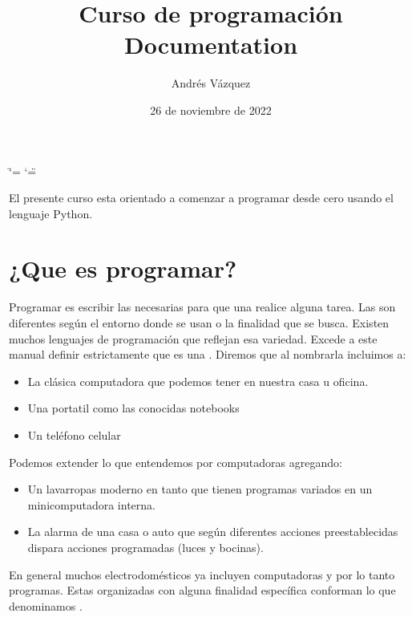 \documentclass[a5paper,9pt,spanish]{sphinxmanual}
\title{Curso de programación Documentation}
\date{26 de noviembre de 2022}
\author{Andrés Vázquez}
\begin{document}
\ifdefined\shorthandoff
  \ifnum\catcode`\=\string=\active\shorthandoff{=}\fi
  \ifnum\catcode`\"=\active{}\fi
\fi

\pagestyle{empty}
\sphinxmaketitle
\pagestyle{plain}
\sphinxtableofcontents
\pagestyle{normal}
\label{\detokenize{index::doc}}


\sphinxAtStartPar
El presente curso esta orientado a comenzar a programar desde cero usando el lenguaje Python.

\sphinxstepscope


\chapter{¿Que es programar?}
\label{\detokenize{que:que-es-programar}}\label{\detokenize{que::doc}}
\sphinxAtStartPar
Programar es escribir las  necesarias para que una  realice alguna tarea.
Las  son diferentes según el entorno donde se usan o la finalidad que se busca.
Existen muchos lenguajes de programación que reflejan esa variedad.
Excede a este manual definir estrictamente que es una . Diremos que al nombrarla incluimos a:
\begin{itemize}
\item {} 
\sphinxAtStartPar
La clásica computadora que podemos tener en nuestra casa u oficina.

\item {} 
\sphinxAtStartPar
Una portatil como las conocidas notebooks

\item {} 
\sphinxAtStartPar
Un teléfono celular

\end{itemize}

\sphinxAtStartPar
Podemos extender lo que entendemos por computadoras agregando:
\begin{itemize}
\item {} 
\sphinxAtStartPar
Un lavarropas moderno en tanto que tienen programas variados en un mini\sphinxhyphen{}computadora interna.

\item {} 
\sphinxAtStartPar
La alarma de una casa o auto que según diferentes acciones pre\sphinxhyphen{}establecidas dispara acciones programadas (luces y bocinas).

\end{itemize}

\sphinxAtStartPar
En general muchos electrodomésticos ya incluyen computadoras y por lo tanto programas.
Estas  organizadas con alguna finalidad específica conforman lo que denominamos .
\end{document}

